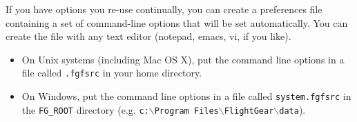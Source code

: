 If you have options you re-use continually, you can create a preferences file
containing a set of command-line options that will be set automatically. You
can create the file with any text editor (notepad, emacs, vi, if you like).

\begin{itemize}
\item On Unix systems (including Mac OS X), put the command line options in a
file called \texttt{.fgfsrc} in your home directory.

\item On Windows, put the command line options in a file called \texttt{system.fgfsrc}
 in the \texttt{FG\_ROOT} directory (e.g. \texttt{c:$\backslash$Program Files$\backslash$FlightGear$\backslash$data}).
\end{itemize}

